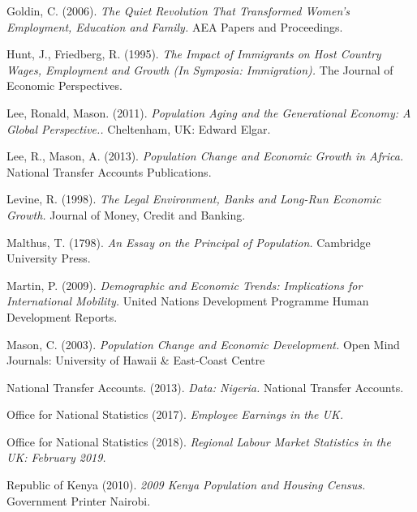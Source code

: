 \documentclass[11pt, english]{article}
\begin{document}
\begin{thebibliography}{9}
        	Goldin, C. (2006).        
		\textsl{The Quiet Revolution That Transformed Women’s Employment, Education and Family.}
		AEA Papers and Proceedings.
			
                Hunt, J., Friedberg, R. (1995).           
                \textsl{The Impact of Immigrants on Host Country Wages, Employment and Growth (In Symposia: Immigration).}                          
      		The Journal of Economic Perspectives.
	
                Lee, Ronald, Mason. (2011).
                \textsl{Population Aging and the Generational Economy: A Global Perspective..}                                             
      		Cheltenham, UK: Edward Elgar.
	
                Lee, R., Mason, A. (2013).
		\textsl{Population Change and Economic Growth in Africa.}
		National Transfer Accounts Publications.
			
                Levine, R. (1998).
                \textsl{The Legal Environment, Banks and Long-Run Economic Growth.}
		Journal of Money, Credit and Banking.
	
                Malthus, T. (1798).
                \textsl{An Essay on the Principal of Population.}
     		Cambridge University Press.

                Martin, P. (2009).
		\textsl{Demographic and Economic Trends: Implications for International Mobility.}
		United Nations Development Programme Human Development Reports.
			
                Mason, C. (2003).
                \textsl{Population Change and Economic Development.}                                        Open Mind Journals: University of Hawaii \& East-Coast Centre
	
        	National Transfer Accounts. (2013).
                \textsl{Data: Nigeria.} 
		National Transfer Accounts.
	
                Office for National Statistics (2017).          
                \textsl{Employee Earnings in the UK.}

                Office for National Statistics (2018).
		\textsl{Regional Labour Market Statistics in the UK: February 2019.}
			
                Republic of Kenya (2010).
                \textsl{2009 Kenya Population and Housing Census.}
		Government Printer Nairobi.
	

\end{thebibliography}
\end{document}
